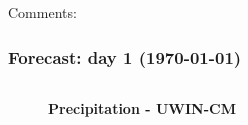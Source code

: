 \documentclass[aspectratio=169, 10pt]{beamer}
\begin{document}
\begin{frame}
\begin{columns}
\begin{column}{0.5\textwidth}
\end{column}
\end{columns}
\vspace{.2cm}
Comments:



\end{frame}



\begin{frame}
\frametitle{Forecast: day 1 ({\AdvanceDate[+1]\today})}


\begin{columns}
\begin{column}{0.5\textwidth}


\vspace{-1.4cm}
\begin{figure}
\textbf{Precipitation - UWIN-CM} \vspace{0.06cm}\\
\end{figure}

\end{column}
\begin{column}{0.5\textwidth}


\end{column}
\end{columns}
\end{frame}
\end{document}
